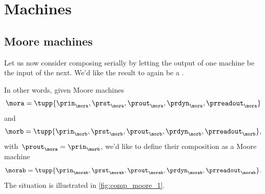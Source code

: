 

\section[Machines]{Machines}
\label{sec:cat-machines}


\subsection{Moore machines}


Let us now consider composing  serially by letting the output of one machine be the input of the next.
We'd like the result to again be a .

\begin{marginfigure}
    \centering
    \caption{Composition of  (first version).}
    \label{fig:comp_moore_1}
\end{marginfigure}

In other words, given Moore machines
%
\begin{equation}
    \label{eq:moore-mora}
    \mora = \tupp{\prin_{\mora},\prst_{\mora},\prout_{\mora},\prdyn_{\mora},\prreadout_{\mora}}
\end{equation}
%
and
%
\begin{equation}
    \label{eq:moore-morb}
    \morb = \tupp{\prin_{\morb},\prst_{\morb},\prout_{\morb},\prdyn_{\morb},\prreadout_{\morb}},
\end{equation}
with~$\prout_{\mora} = \prin_{\morb}$, we'd like to define their composition as a Moore machine
\begin{equation}
    \label{eq:moore-morab-comp}
    \morab = \tupp{\prin_{\morab},\prst_{\morab},\prout_{\morab},\prdyn_{\morab},\prreadout_{\morab}}.
\end{equation}
The situation is illustrated in \cref{fig:comp_moore_1}.

